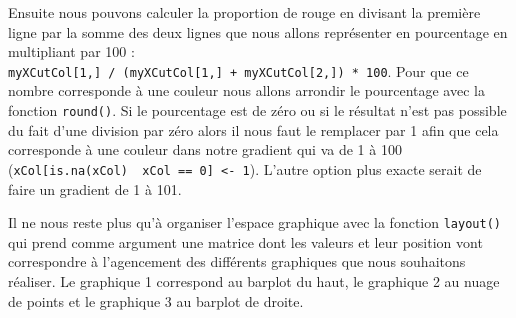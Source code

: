 \documentclass[
]{book}
\begin{document}
Ensuite nous pouvons calculer la proportion de rouge en divisant la première ligne par la somme des deux lignes que nous allons représenter en pourcentage en multipliant par 100 : \texttt{myXCutCol{[}1,{]}\ /\ (myXCutCol{[}1,{]}\ +\ myXCutCol{[}2,{]})\ *\ 100}. Pour que ce nombre corresponde à une couleur nous allons arrondir le pourcentage avec la fonction \texttt{round()}. Si le pourcentage est de zéro ou si le résultat n'est pas possible du fait d'une division par zéro alors il nous faut le remplacer par 1 afin que cela corresponde à une couleur dans notre gradient qui va de 1 à 100 (\texttt{xCol{[}is.na(xCol)\ \textbar{}\ xCol\ ==\ 0{]}\ \textless{}-\ 1}). L'autre option plus exacte serait de faire un gradient de 1 à 101.

Il ne nous reste plus qu'à organiser l'espace graphique avec la fonction \texttt{layout()} qui prend comme argument une matrice dont les valeurs et leur position vont correspondre à l'agencement des différents graphiques que nous souhaitons réaliser. Le graphique 1 correspond au barplot du haut, le graphique 2 au nuage de points et le graphique 3 au barplot de droite.
\end{document}
